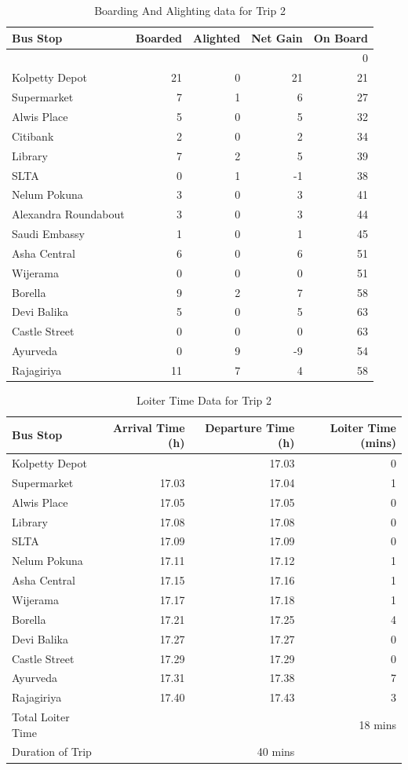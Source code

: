 \documentclass[12pt, oneside]{report}
\begin{document}
\begin{table}
\centering
\begin{tabular}{|l|r|r|r|r|}
\hline
Bus Stop & Boarded & Alighted & Net Gain & On Board \\
\hline
 & & & & 0 \\
Kolpetty Depot	&21	&0	&21	&21\\
Supermarket	&7	&1	&6	&27\\
Alwis Place	&5	&0	&5	&32\\
\rowcolor[gray]{0.7}
Citibank	&2	&0	&2	&34\\
Library	&7	&2	&5	&39\\
SLTA	&0	&1	&-1	&38\\
Nelum Pokuna	&3	&0	&3	&41\\
\rowcolor[gray]{0.7}
Alexandra Roundabout	&3	&0	&3	&44\\
\rowcolor[gray]{0.7}
Saudi Embassy	&1	&0	&1	&45\\
Asha Central	&6	&0	&6	&51\\
Wijerama	&0	&0	&0	&51\\
Borella	&9	&2	&7	&58\\
Devi Balika	&5	&0	&5	&63\\
Castle Street	&0	&0	&0	&63\\
Ayurveda	&0	&9	&-9	&54\\
Rajagiriya	&11	&7	&4	&58\\
\hline
\end{tabular}
\caption{Boarding And Alighting data for Trip 2}
\label{table-trip2-BoardingAndAlighting}
\end{table}

\begin{table}
\centering
\begin{tabular}{|l|r|r|r|}
\hline
Bus Stop & Arrival Time (h) & Departure Time (h) & Loiter Time (mins) \\
\hline
Kolpetty Depot	&	&17.03	&0\\
Supermarket	&17.03	&17.04	&1\\
Alwis Place	&17.05	&17.05	&0\\
Library	&17.08	&17.08	&0\\
SLTA	&17.09	&17.09	&0\\
Nelum Pokuna	&17.11	&17.12	&1\\
Asha Central	&17.15	&17.16	&1\\
Wijerama	&17.17	&17.18	&1\\
Borella	&17.21	&17.25	&4\\
Devi Balika	&17.27	&17.27	&0\\
Castle Street	&17.29	&17.29	&0\\
Ayurveda	&17.31	&17.38	&7\\
Rajagiriya	&17.40	&17.43	&3\\
\hline
Total Loiter Time & & & 18 mins \\
Duration of Trip & & 40 mins & \\
\hline
\end{tabular}
\caption{Loiter Time Data for Trip 2}
\label{table-trip2-LoiterTime}
\end{table}
\end{document}

